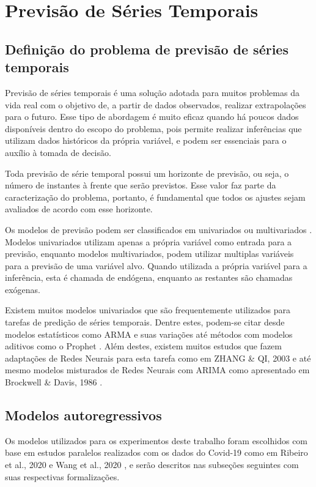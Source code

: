 \chapter{Previsão de Séries Temporais}
\label{chap:02}

\section{Definição do problema de previsão de séries temporais}
Previsão de séries temporais é uma solução adotada para muitos problemas da vida real com o objetivo de, a partir de dados observados, realizar extrapolações para o futuro. Esse tipo de abordagem é muito eficaz quando há poucos dados disponíveis dentro do escopo do problema, pois permite realizar inferências que utilizam dados históricos da própria variável, e podem ser essenciais para o auxílio à tomada de decisão.

Toda previsão de série temporal possui um horizonte de previsão, ou seja, o número de instantes à frente que serão previstos. Esse valor faz parte da caracterização do problema, portanto, é fundamental que todos os ajustes sejam avaliados de acordo com esse horizonte.

Os modelos de previsão podem ser classificados em univariados ou multivariados \cite{box&jenkins}. Modelos univariados utilizam apenas a própria variável como entrada para a previsão, enquanto modelos multivariados, podem utilizar multiplas variáveis para a previsão de uma variável alvo. Quando utilizada a própria variável para a inferência, esta é chamada de endógena, enquanto as restantes são chamadas exógenas.

Existem muitos modelos univariados que são frequentemente utilizados para tarefas de predição de séries temporais. Dentre estes, podem-se citar desde modelos estatísticos como ARMA \cite{box&jenkins} e suas variações \cite{ALZAHRANI2020914} até métodos com modelos aditivos como o Prophet \cite{fbprophet}. Além destes, existem muitos estudos que fazem adaptações de Redes Neurais para esta tarefa como em ZHANG \& QI, 2003 \cite{ZHANG2005501} e até mesmo modelos misturados de Redes Neurais com ARIMA como apresentado em Brockwell \& Davis, 1986 \cite{ZHANG2003159}.

\section{Modelos autoregressivos}
Os modelos utilizados para os experimentos deste trabalho foram escolhidos com base em estudos paralelos realizados com os dados do Covid-19 como em Ribeiro et al., 2020 \cite{RIBEIRO2020109853} e Wang et al., 2020 \cite{WANG2020110058}, e serão descritos nas subseções seguintes com suas respectivas formalizações.
